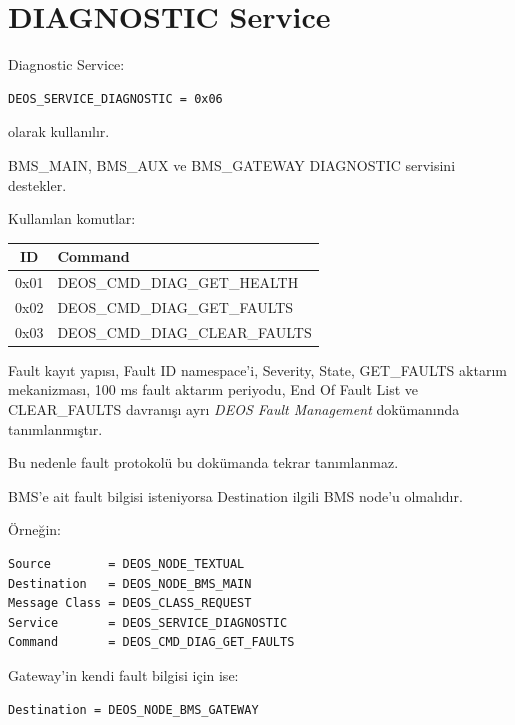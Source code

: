 \documentclass[a4paper,10pt]{article}
\begin{document}
\section{DIAGNOSTIC Service}

Diagnostic Service:

\begin{lstlisting}
DEOS_SERVICE_DIAGNOSTIC = 0x06
\end{lstlisting}

olarak kullanılır.

BMS\_MAIN, BMS\_AUX ve BMS\_GATEWAY DIAGNOSTIC servisini destekler.

Kullanılan komutlar:

\begin{center}
\begin{tabular}{c l}
\toprule
\textbf{ID} & \textbf{Command} \\
\midrule

0x01 & DEOS\_CMD\_DIAG\_GET\_HEALTH \\
0x02 & DEOS\_CMD\_DIAG\_GET\_FAULTS \\
0x03 & DEOS\_CMD\_DIAG\_CLEAR\_FAULTS \\

\bottomrule
\end{tabular}
\end{center}

Fault kayıt yapısı, Fault ID namespace'i, Severity, State,
GET\_FAULTS aktarım mekanizması, 100 ms fault aktarım periyodu,
End Of Fault List ve CLEAR\_FAULTS davranışı ayrı
\textit{DEOS Fault Management} dokümanında tanımlanmıştır.

Bu nedenle fault protokolü bu dokümanda tekrar tanımlanmaz.

BMS'e ait fault bilgisi isteniyorsa Destination ilgili BMS node'u
olmalıdır.

Örneğin:

\begin{lstlisting}
Source        = DEOS_NODE_TEXTUAL
Destination   = DEOS_NODE_BMS_MAIN
Message Class = DEOS_CLASS_REQUEST
Service       = DEOS_SERVICE_DIAGNOSTIC
Command       = DEOS_CMD_DIAG_GET_FAULTS
\end{lstlisting}

Gateway'in kendi fault bilgisi için ise:

\begin{lstlisting}
Destination = DEOS_NODE_BMS_GATEWAY
\end{lstlisting}
\end{document}
